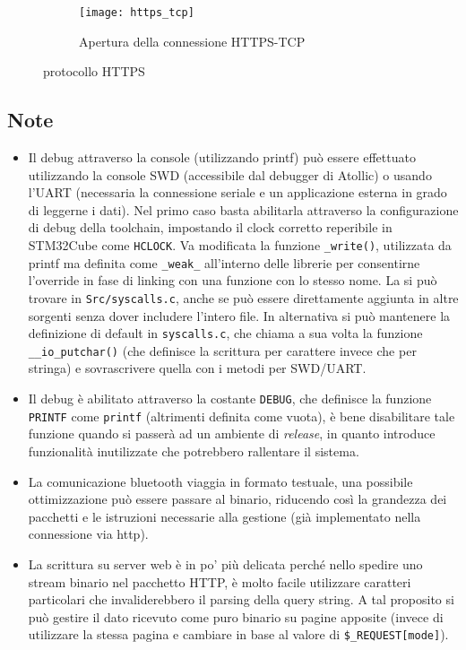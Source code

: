 \begin{figure}[ht]
  \center
  \begin{subfigure}{\textwidth}
    \texttt{[image: https\_tcp]}
    \caption{Apertura della connessione HTTPS-TCP}
  \end{subfigure}
  \caption{protocollo HTTPS}
  \label{fig:https_tcp}
\end{figure}

\newpage

\subsection{Note}
\begin{itemize}
  \item Il debug attraverso la console (utilizzando printf) pu\`o essere effettuato utilizzando la console SWD (accessibile dal debugger di Atollic) o usando l'UART (necessaria la connessione seriale e un applicazione esterna in grado di leggerne i dati). Nel primo caso basta abilitarla attraverso la configurazione di debug della toolchain, impostando il clock corretto reperibile in STM32Cube come \texttt{HCLOCK}. Va modificata la funzione \texttt{\_write()}, utilizzata da printf ma definita come \texttt{\_weak\_} all'interno delle librerie per consentirne l'override in fase di linking con una funzione con lo stesso nome. La si pu\`o trovare in \texttt{Src/syscalls.c}, anche se pu\`o essere direttamente aggiunta in altre sorgenti senza dover includere l'intero file. In alternativa si pu\`o mantenere la definizione di default in \texttt{syscalls.c}, che chiama a sua volta la funzione \texttt{\_\_io\_putchar()} (che definisce la scrittura per carattere invece che per stringa) e sovrascrivere quella con i metodi per SWD/UART.
  \item Il debug \`e abilitato attraverso la costante \texttt{DEBUG}, che definisce la funzione \texttt{PRINTF} come \texttt{printf} (altrimenti definita come vuota), \`e bene disabilitare tale funzione quando si passer\`a ad un ambiente di \textit{release}, in quanto introduce funzionalit\`a inutilizzate che potrebbero rallentare il sistema.
  \item La comunicazione bluetooth viaggia in formato testuale, una possibile ottimizzazione pu\`o essere passare al binario, riducendo cos\`i la grandezza dei pacchetti e le istruzioni necessarie alla gestione (gi\`a implementato nella connessione via http).
  \item La scrittura su server web \`e in po' pi\`u delicata perch\'e nello spedire uno stream binario nel pacchetto HTTP, \`e molto facile utilizzare caratteri particolari che invaliderebbero il parsing della query string. A tal proposito si pu\`o gestire il dato ricevuto come puro binario su pagine apposite (invece di utilizzare la stessa pagina e cambiare in base al valore di \texttt{\$\_REQUEST[mode]}).

\end{itemize}
